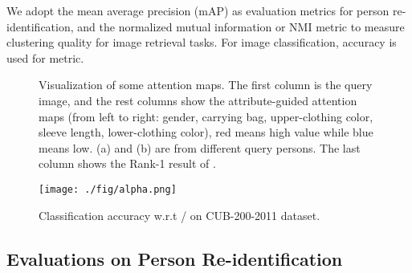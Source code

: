 \documentclass[sigconf]{acmart}
\begin{document}
We adopt the mean average precision (mAP) \cite{bai2017scalable} as evaluation metrics for person re-identification, and the normalized mutual information or NMI metric \cite{nmi} to measure clustering quality for image retrieval tasks. For image classification, accuracy is used for metric.

\begin{figure*}[htb]
\centering
{}
\caption{Visualization of some attention maps. The first column is the query image, and the rest columns show the attribute-guided attention maps (from left to right: gender, carrying bag, upper-clothing color, sleeve length, lower-clothing color), red means high value while blue means low. (a) and (b) are from different query persons. The last column shows the Rank-1 result of .}
\label{fig:visualization}
\end{figure*}

\begin{figure}[!htp]
\begin{center}
   \texttt{[image: ./fig/alpha.png]}
\end{center}
   \caption{Classification accuracy w.r.t / on CUB-200-2011 dataset.}
\label{fig:hyper-param}
\end{figure}

\subsection{Evaluations on Person Re-identification}
\end{document}
